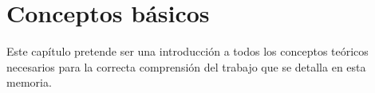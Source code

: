 \documentclass[main]{subfiles}
\begin{document}
\chapter{Conceptos básicos}\label{preliminares}\label{basicos}

Este capítulo pretende ser una introducción a todos los conceptos teóricos necesarios para la correcta comprensión del trabajo que se detalla en esta memoria.








\end{document}
